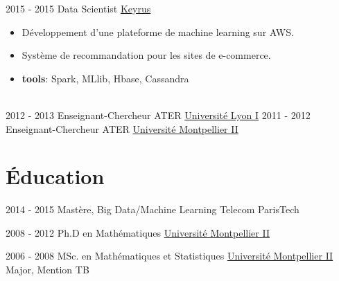 \documentclass[letterpaper]{twentysecondcvfr} %
\begin{document}
\begin{twenty}
     \twentyitem
   		{2015 - 2015}
		{}
        {Data Scientist}
        {\href{http://www.keyrus.com/}{Keyrus}}
        {}
        {
        \begin{itemize}
        \item D\'eveloppement d'une plateforme de machine learning sur AWS. 
				\item Syst\`eme de recommandation pour les sites de e-commerce.
				\item \textbf{tools}: Spark, MLlib, Hbase, Cassandra
    \end{itemize} }\\
		
	\twentyitem
   		{2012 - 2013}
		{}
        {Enseignant-Chercheur ATER}
        {\href{http://www.univ-lyon1.fr/}{Universit\'e Lyon I}}
        {}
        {}
	\twentyitem
   		{2011 - 2012}
		{}
        {Enseignant-Chercheur ATER}
        {\href{http://www.umontpellier.fr/}{Universit\'e Montpellier II}}
        {}
        {}
        
\end{twenty}





\vspace{-0.5cm}
\section{\'Education}{\faGraduationCap}

\begin{twenty} %
	\twentyitemshorttest
    	{2014 - 2015}
        {}
        {Mast\`ere, Big Data/Machine Learning}
        {Telecom ParisTech}{}
				
	\twentyitemshorttest
    	{2008 - 2012}
		{}
        {Ph.D en Math\'ematiques}
        {\href{http://www.umontpellier.fr/}{Universit\'e Montpellier II}}
        {}
				
	\twentyitemshorttest
    	{2006 - 2008}
		{}
        {MSc. en Math\'ematiques et Statistiques}
        {\href{http://www.umontpellier.fr/}{Universit\'e Montpellier II}}
        {Major, Mention TB}
\end{twenty}
\end{document}

